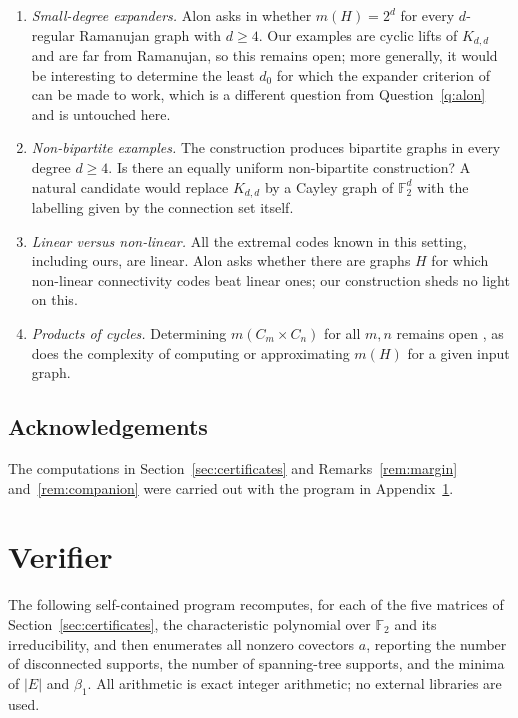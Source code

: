 \documentclass[11pt,reqno]{amsart}
\theoremstyle{plain}
\theoremstyle{definition}
\newcommand{\FF}{\mathbb{F}}
\begin{document}
\begin{enumerate}
\item[(a)] \emph{Small-degree expanders.} Alon asks in \cite{AlonConn} whether $m(H)=2^{d}$ for every $d$-regular Ramanujan graph with $d\ge 4$. Our examples are cyclic lifts of $K_{d,d}$ and are far from Ramanujan, so this remains open; more generally, it would be interesting to determine the least $d_{0}$ for which the expander criterion of \cite{AlonConn} can be made to work, which is a different question from Question~\ref{q:alon} and is untouched here.
\item[(b)] \emph{Non-bipartite examples.} The construction produces bipartite graphs in every degree $d\ge 4$. Is there an equally uniform non-bipartite construction? A natural candidate would replace $K_{d,d}$ by a Cayley graph of $\FF_{2}^{d}$ with the labelling given by the connection set itself.
\item[(c)] \emph{Linear versus non-linear.} All the extremal codes known in this setting, including ours, are linear. Alon \cite{AlonConn} asks whether there are graphs $H$ for which non-linear connectivity codes beat linear ones; our construction sheds no light on this.
\item[(d)] \emph{Products of cycles.} Determining $m(C_{m}\times C_{n})$ for all $m,n$ remains open \cite{AlonConn,BGMW}, as does the complexity of computing or approximating $m(H)$ for a given input graph.
\end{enumerate}

\subsection*{Acknowledgements}
The computations in Section~\ref{sec:certificates} and Remarks~\ref{rem:margin} and~\ref{rem:companion} were carried out with the program in Appendix~\ref{app:code}.

\appendix

\section{Verifier}\label{app:code}

The following self-contained program recomputes, for each of the five matrices of Section~\ref{sec:certificates}, the characteristic polynomial over $\FF_{2}$ and its irreducibility, and then enumerates all nonzero covectors $a$, reporting the number of disconnected supports, the number of spanning-tree supports, and the minima of $|E|$ and $\beta_{1}$. All arithmetic is exact integer arithmetic; no external libraries are used.
\end{document}
